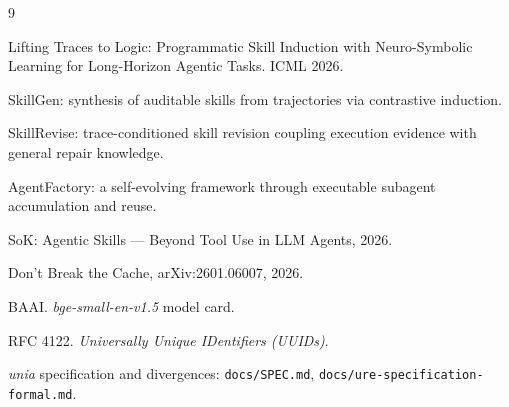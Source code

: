 \documentclass[11pt,twocolumn]{article}
\begin{document}
\begin{thebibliography}{9}

 Lifting Traces to Logic: Programmatic Skill Induction with
  Neuro-Symbolic Learning for Long-Horizon Agentic Tasks. ICML 2026.

 SkillGen: synthesis of auditable skills from trajectories via
  contrastive induction.

 SkillRevise: trace-conditioned skill revision coupling
  execution evidence with general repair knowledge.

 AgentFactory: a self-evolving framework through
  executable subagent accumulation and reuse.

 SoK: Agentic Skills --- Beyond Tool Use in LLM Agents, 2026.

 Don't Break the Cache, arXiv:2601.06007, 2026.

 BAAI. \emph{bge-small-en-v1.5} model card.

 RFC 4122. \emph{Universally Unique IDentifiers (UUIDs)}.

 \emph{unia} specification and divergences:
  \texttt{docs/SPEC.md}, \texttt{docs/ure-specification-formal.md}.

\end{thebibliography}
\end{document}
